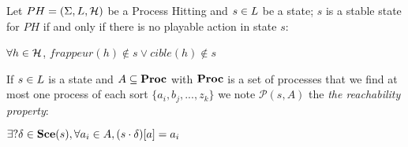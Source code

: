\begin{definition}
\label{def:FixPoint2}
Let $PH = (\Sigma,L,\mathcal{H})$ be a Process Hitting and
$s \in L$ be a state;
$s$ is a stable state for $PH$ if and only if there is no playable action in state $s$: 
\begin{center}
$\forall h \in \mathcal{H}$, $frappeur(h) \notin s \vee cible(h) \notin s$
\end{center}
\end{definition}


\begin{definition}
\label{def:reachability}

 If $s \in L$ is a state and $A \subseteq \mathbf{Proc}$ with $\mathbf{Proc}$ is a set of processes that we find at most one process of each sort $\{a_i, b_j,..., z_k\}$ 
 we note $\mathcal{P}(s, A)$ the \emph{the reachability property}:
 \begin{center}
  $\exists? \delta \in \mathbf{Sce}(s), \forall a_i \in A, {(s \cdot \delta)[a]}=a_i$
 \end{center}
\end{definition}


